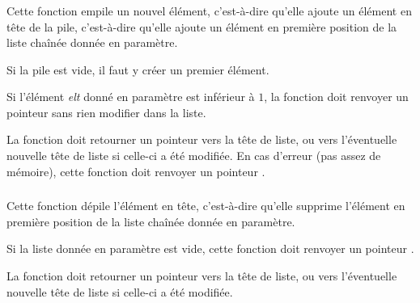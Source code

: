 \clearpage


\subsubsection*{}

\noindent Cette fonction empile un nouvel élément, c'est-à-dire qu'elle ajoute un élément en tête de la pile, c'est-à-dire qu'elle ajoute un élément en première position de la liste chaînée donnée en paramètre.

\smallskip

\noindent Si la pile est vide, il faut y créer un premier élément.

\noindent Si l'élément \textit{elt} donné en paramètre est inférieur à $ 1 $, la fonction doit renvoyer un pointeur  sans rien modifier dans la liste.

\smallskip

\noindent La fonction doit retourner un pointeur vers la tête de liste, ou vers l'éventuelle nouvelle tête de liste si celle-ci a été modifiée.
%
En cas d'erreur (pas assez de mémoire), cette fonction doit renvoyer un pointeur .

%

\bigskip


\subsubsection*{}

\noindent Cette fonction dépile l'élément en tête, c'est-à-dire qu'elle supprime l'élément en première position de la liste chaînée donnée en paramètre.

\smallskip

\noindent Si la liste donnée en paramètre est vide, cette fonction doit renvoyer un pointeur .

\smallskip

\noindent La fonction doit retourner un pointeur vers la tête de liste, ou vers l'éventuelle nouvelle tête de liste si celle-ci a été modifiée.

